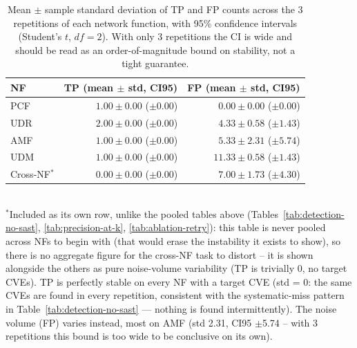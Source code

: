 \begin{table}[t]
\end{table}

\begin{table}[t]
\centering
\caption{Mean $\pm$ sample standard deviation of TP and FP counts across the 3 repetitions of each network function, with 95\% confidence intervals (Student's $t$, $df=2$). With only 3 repetitions the CI is wide and should be read as an order-of-magnitude bound on stability, not a tight guarantee.}
\label{tab:variability}
\begin{tabular}{lrr}
\toprule
NF & TP (mean $\pm$ std, CI95) & FP (mean $\pm$ std, CI95) \\
\midrule
PCF & $1.00 \pm 0.00$ ($\pm 0.00$) & $0.00 \pm 0.00$ ($\pm 0.00$) \\
UDR & $2.00 \pm 0.00$ ($\pm 0.00$) & $4.33 \pm 0.58$ ($\pm 1.43$) \\
AMF & $1.00 \pm 0.00$ ($\pm 0.00$) & $5.33 \pm 2.31$ ($\pm 5.74$) \\
UDM & $1.00 \pm 0.00$ ($\pm 0.00$) & $11.33 \pm 0.58$ ($\pm 1.43$) \\
\midrule
Cross-NF$^{*}$ & $0.00 \pm 0.00$ ($\pm 0.00$) & $7.00 \pm 1.73$ ($\pm 4.30$) \\
\bottomrule
\end{tabular}
\\[2pt]
\footnotesize{$^{*}$Included as its own row, unlike the pooled tables above (Tables~\ref{tab:detection-no-sast}, \ref{tab:precision-at-k}, \ref{tab:ablation-retry}): this table is never pooled across NFs to begin with (that would erase the instability it exists to show), so there is no aggregate figure for the cross-NF task to distort -- it is shown alongside the others as pure noise-volume variability (TP is trivially 0, no target CVEs). TP is perfectly stable on every NF with a target CVE (std = 0: the same CVEs are found in every repetition, consistent with the systematic-miss pattern in Table~\ref{tab:detection-no-sast} — nothing is found intermittently). The noise volume (FP) varies instead, most on AMF (std 2.31, CI95 $\pm$5.74 -- with 3 repetitions this bound is too wide to be conclusive on its own).}
\end{table}

